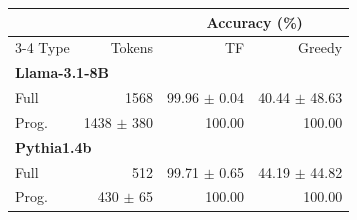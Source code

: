 \begin{tabular}{lrrr}
\toprule
 & & \multicolumn{2}{c}{Accuracy (\%)} \\
\cmidrule(lr){3-4}
 Type                                           & Tokens                  & TF                        & Greedy                     \\
\midrule
 \multicolumn{4}{l}{\textbf{Llama-3.1-8B}} \\
 Full                                           & 1568                    & 99.96 {\small $\pm$ 0.04} & 40.44 {\small $\pm$ 48.63} \\
 Prog.                                          & 1438 {\small $\pm$ 380} & 100.00                    & 100.00                     \\
 \midrule \midrule
 \multicolumn{4}{l}{\textbf{Pythia1.4b}} \\
 Full                                           & 512                     & 99.71 {\small $\pm$ 0.65} & 44.19 {\small $\pm$ 44.82} \\
 Prog.                                          & 430 {\small $\pm$ 65}   & 100.00                    & 100.00                     \\
\bottomrule
\end{tabular}
